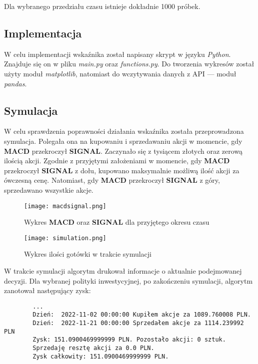 \documentclass{article}
\begin{document}
    Dla wybranego przedziału czasu istnieje dokładnie 1000 próbek.

    \subsection{Implementacja}
    W celu implementacji wskaźnika został napisany skrypt w języku \textit{Python}.
    Znajduje się on w pliku \textit{main.py} oraz \textit{functions.py}. Do tworzenia wykresów
    został użyty moduł \textit{matplotlib}, natomiast do wczytywania danych z API --- moduł \textit{pandas}.
    \subsection{Symulacja}
    W celu sprawdzenia poprawności działania wskaźnika została przeprowadzona symulacja.
    Polegała ona na kupowaniu i sprzedawaniu akcji w momencie, gdy \textbf{MACD} przekroczył \textbf{SIGNAL}.
    Zaczynało się z tysiącem złotych oraz zerową ilością akcji.
    Zgodnie z przyjętymi założeniami w momencie, gdy \textbf{MACD} przekroczył \textbf{SIGNAL} z dołu, kupowano maksymalnie możliwą ilość akcji 
    za ówczesną cenę.
    Natomiast, gdy \textbf{MACD} przekroczył \textbf{SIGNAL} z góry, sprzedawano wszystkie akcje.
    
    \begin{figure}[H]
        \texttt{[image: macdsignal.png]}
        \centering
        \caption{Wykres \textbf{MACD} oraz \textbf{SIGNAL} dla przyjętego okresu czasu}
    \end{figure}

    \begin{figure}[H]
        \texttt{[image: simulation.png]}
        \centering
        \caption{Wykres ilości gotówki w trakcie symulacji}
    \end{figure}

    W trakcie symulacji algorytm drukował informacje o aktualnie podejmowanej decyzji.
    Dla wybranej polityki inwestycyjnej, po zakończeniu symulacji, algorytm zanotował następujący zysk:
    \begin{verbatim}
        ...
        Dzień:  2022-11-02 00:00:00 Kupiłem akcje za 1089.760008 PLN.
        Dzień:  2022-11-21 00:00:00 Sprzedałem akcje za 1114.239992 PLN
        Zysk: 151.0900469999999 PLN. Pozostało akcji: 0 sztuk.
        Sprzedaję resztę akcji za 0.0 PLN.
        Zysk całkowity: 151.0900469999999 PLN.
    \end{verbatim}
\end{document}
